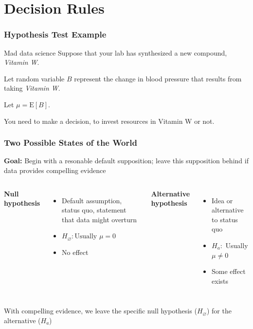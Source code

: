 \documentclass[12pt, block=fill]{beamer}
\newcommand{\E}{\text{E}}
\begin{document}

\section{Decision Rules}

\begin{frame}
  \frametitle{Hypothesis Test Example}

  \begin{exampleblock}{Mad data science}
    Suppose that your lab has synthesized a new compound, 
    \textit{Vitamin W}.

    Let random variable $B$ represent the change in blood pressure that results from taking
    \textit{Vitamin W}.
    
    Let $\mu = \E[B]$.

    You need to make a decision, to invest resources in Vitamin W or not. 
  \end{exampleblock}
  
   
 \end{frame}

\begin{frame}
  \frametitle{Two Possible States of the World}
  \textbf{Goal:} Begin with a resonable default supposition; leave
  this supposition behind if data provides compelling evidence
  \begin{columns}[t]
    \textbf{Null hypothesis}
    \begin{itemize}
    \item Default assumption, status quo, statement that data might overturn
    \item  $H_\varnothing: \text{Usually } \mu=0$
    \item No effect
    \end{itemize}
    \textbf{Alternative hypothesis}
    \begin{itemize}
    \item Idea or alternative to status quo
    \item $H_a:$ Usually  $\mu \neq 0$
    \item Some effect exists
    \end{itemize}
  \end{columns}
  
  With compelling evidence, we leave the specific null hypothesis
  ($H_{\varnothing}$) for the alternative ($H_{a}$)
\end{frame}
\end{document}

